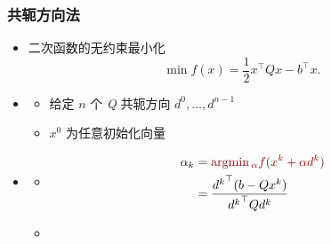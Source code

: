 \documentclass{beamer}
\begin{document}
	\begin{frame}
		\frametitle{\secno 共轭方向法}
		
		\begin{itemize}
			\item {} 二次函数的无约束最小化
			\begin{equation}
				\min f(x)=\frac{1}{2}x^{\top}Qx-b^{\top}x.
			\end{equation}
			
			\item {}
			\begin{itemize}
				\item   给定 $n$ 个 \emph{Q} 共轭方向 $d^0,\dots, d^{n-1}$
				
				\item $x^0$ 为任意初始化向量
				
			\end{itemize}
			
			\item {}
			\begin{itemize}
				\item
				\begin{equation}
					\begin{aligned}
						\alpha_k & = \dred{ \argmin_{\alpha} f(x^k+{\alpha}d^k) }\\
						& =\frac{{d^k}^{\top}(b-Qx^k)}{{d^k}^{\top}Q{d^k}} \\
					\end{aligned}
				\end{equation}
				
				\item
				
			\end{itemize}
			
		\end{itemize}
	\end{frame}
	
\end{document}
